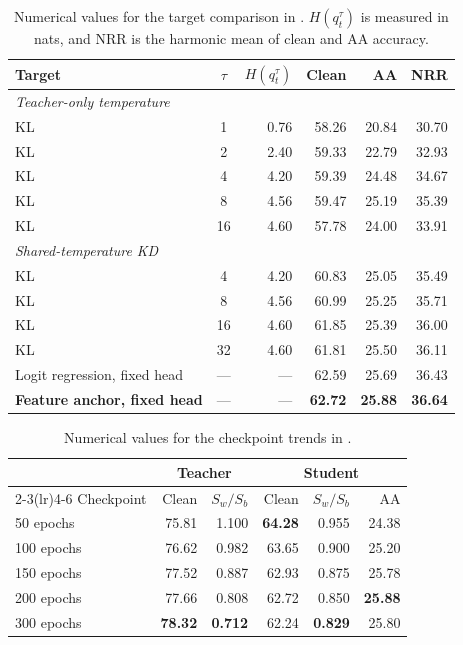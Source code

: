 \begin{table}[!htbp]
  \centering \small \setlength{\tabcolsep}{4pt}
  \caption{Numerical values for the target comparison in .
  $H(q_t^\tau)$ is measured in nats, and NRR is the harmonic mean of clean and AA accuracy.}
  \label{tab:targetcomparison_values}
  \begin{tabular}{lcrrrr}
    \toprule
    Target & $\tau$ & $H(q_t^\tau)$ & Clean & AA & NRR \\
    \midrule
    \multicolumn{6}{l}{\emph{Teacher-only temperature}} \\
    KL & 1  & 0.76 & 58.26 & 20.84 & 30.70 \\
    KL & 2  & 2.40 & 59.33 & 22.79 & 32.93 \\
    KL & 4  & 4.20 & 59.39 & 24.48 & 34.67 \\
    KL & 8  & 4.56 & 59.47 & 25.19 & 35.39 \\
    KL & 16 & 4.60 & 57.78 & 24.00 & 33.91 \\
    \midrule
    \multicolumn{6}{l}{\emph{Shared-temperature KD}} \\
    KL & 4  & 4.20 & 60.83 & 25.05 & 35.49 \\
    KL & 8  & 4.56 & 60.99 & 25.25 & 35.71 \\
    KL & 16 & 4.60 & 61.85 & 25.39 & 36.00 \\
    KL & 32 & 4.60 & 61.81 & 25.50 & 36.11 \\
    \midrule
    Logit regression, fixed head  & --- & --- & 62.59 & 25.69 & 36.43 \\
    \textbf{Feature anchor, fixed head} & --- & --- & \textbf{62.72} & \textbf{25.88} & \textbf{36.64} \\
    \bottomrule
  \end{tabular}
\end{table}

\begin{table}[!htbp]
  \centering \small \setlength{\tabcolsep}{4pt}
  \caption{Numerical values for the checkpoint trends in .}
  \label{tab:teacherladder_values}
  \begin{tabular}{lrrrrr}
    \toprule
    & \multicolumn{2}{c}{Teacher} & \multicolumn{3}{c}{Student} \\
    \cmidrule(lr){2-3}\cmidrule(lr){4-6}
    Checkpoint & Clean & $S_w/S_b$ & Clean & $S_w/S_b$ & AA \\
    \midrule
    50 epochs  & 75.81 & 1.100 & \textbf{64.28} & 0.955 & 24.38 \\
    100 epochs & 76.62 & 0.982 & 63.65 & 0.900 & 25.20 \\
    150 epochs & 77.52 & 0.887 & 62.93 & 0.875 & 25.78 \\
    200 epochs & 77.66 & 0.808 & 62.72 & 0.850 & \textbf{25.88} \\
    300 epochs & \textbf{78.32} & \textbf{0.712} & 62.24 & \textbf{0.829} & 25.80 \\
    \bottomrule
  \end{tabular}
\end{table}

